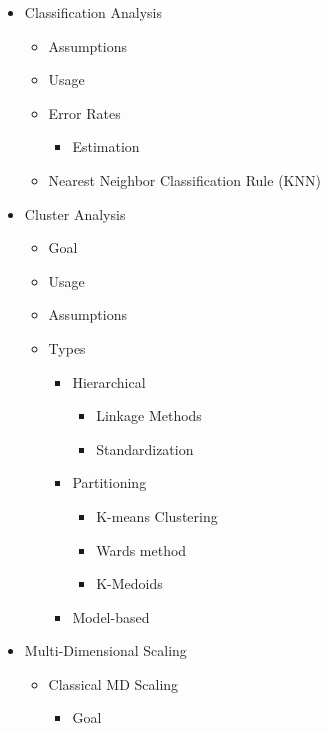 \documentclass[11pt]{article}
\begin{document}
\begin{itemize}
\begin{itemize}
\item Classification Analysis

\begin{itemize}
\item Assumptions
\item Usage
\item Error Rates

\begin{itemize}
\item Estimation
\end{itemize}

\item Nearest Neighbor Classification Rule (KNN)
\end{itemize}

\item Cluster Analysis

\begin{itemize}
\item Goal
\item Usage
\item Assumptions
\item Types

\begin{itemize}
\item Hierarchical

\begin{itemize}
\item Linkage Methods
\item Standardization
\end{itemize}

\item Partitioning

\begin{itemize}
\item K-means Clustering
\item Wards method
\item K-Medoids
\end{itemize}

\item Model-based
\end{itemize}
\end{itemize}

\item Multi-Dimensional Scaling

\begin{itemize}
\item Classical MD Scaling

\begin{itemize}
\item Goal
\end{itemize}
\end{itemize}


\end{itemize}
\end{itemize}
\end{document}
